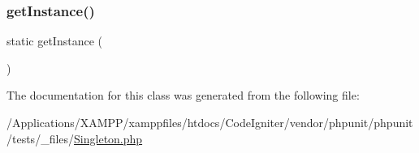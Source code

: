 \subsubsection{\texorpdfstring{get\+Instance()}{getInstance()}}
{\footnotesize\ttfamily static get\+Instance (\begin{DoxyParamCaption}{ }\end{DoxyParamCaption})\hspace{0.3cm}{\ttfamily [static]}}



The documentation for this class was generated from the following file\+:\begin{DoxyCompactItemize}
\item 
/\+Applications/\+X\+A\+M\+P\+P/xamppfiles/htdocs/\+Code\+Igniter/vendor/phpunit/phpunit/tests/\+\_\+files/\mbox{\hyperlink{_singleton_8php}{Singleton.\+php}}\end{DoxyCompactItemize}
